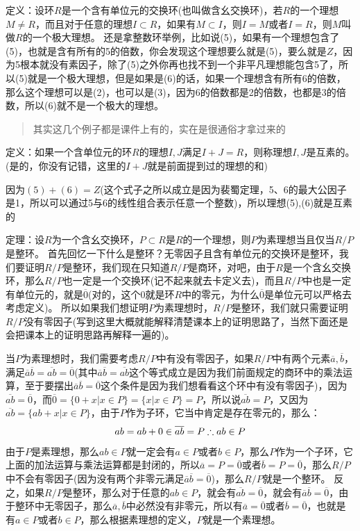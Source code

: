\documentclass[12pt, a4paper, oneside]{ctexart}
\newenvironment{myquote}{\begin{quote}\small\color{gray}}{\end{quote}}
\begin{document}
定义：设环$R$是一个含有单位元的交换环(也叫做含幺交换环)，若$R$的一个理想$M\neq R$，而且对于任意的理想$I\subset R$，如果有$M\subset I$，则$I=M$或者$I=R$，则$M$叫做$R$的一个极大理想。
还是拿整数环举例，比如说(5)，如果有一个理想包含了(5)，也就是含有所有的5的倍数，你会发现这个理想要么就是(5)，要么就是$Z$，因为5根本就没有素因子，除了(5)之外你再也找不到一个非平凡理想能包含5了，所以(5)就是一个极大理想，但是如果是(6)的话，如果一个理想含有所有6的倍数，那么这个理想可以是(2)，也可以是(3)，因为6的倍数都是2的倍数，也都是3的倍数，所以(6)就不是一个极大的理想。

\begin{myquote}
其实这几个例子都是课件上有的，实在是很通俗才拿过来的
\end{myquote}

定义：如果一个含单位元的环$R$的理想$I,J$满足$I+J=R$，则称理想$I,J$是互素的。(是的，你没有记错，这里的$I+J$就是前面提到过的理想的和)

因为$(5)+(6)=Z$(这个式子之所以成立是因为裴蜀定理，5、6的最大公因子是1，所以可以通过5与6的线性组合表示任意一个整数)，所以理想(5),(6)就是互素的

定理：设$R$为一个含幺交换环，$P\subset R$是$R$的一个理想，则$P$为素理想当且仅当$R/P$是整环。
首先回忆一下什么是整环？无零因子且含有单位元的交换环是整环，我们要证明$R/P$是整环，我们现在只知道$R/P$是商环，对吧，由于$R$是一个含幺交换环，那么$R/P$也一定是一个交换环(记不起来就去卡定义去)，而且$R/P$中也是一定有单位元的，就是$\overline{0}$(对的，这个0就是环$R$中的零元，为什么$\overline{0}$是单位元可以严格去考虑定义)。
所以如果我们想证明$P$为素理想时，$R/P$是整环，我们就只需要证明$R/P$没有零因子(写到这里大概就能解释清楚课本上的证明思路了，当然下面还是会把课本上的证明思路再解释一遍的)。

当$P$为素理想时，我们需要考虑$R/P$中有没有零因子，如果$R/P$中有两个元素$\overline{a},\overline{b}$，满足$\overline{a}\overline{b}=\overline{ab}=\overline{0}$(其中$\overline{a}\overline{b}=\overline{ab}$这个等式成立是因为我们前面规定的商环中的乘法运算，至于要摆出$\overline{a}\overline{b}=\overline{0}$这个条件是因为我们想看看这个环中有没有零因子)，因为$\overline{ab}=\overline{0}$，而$\overline{0}=\{0+x|x\in P\}=\{x|x\in P\}=P$，所以说$\overline{ab}=P$，又因为$\overline{ab}=\{ab+x|x\in P\}$，由于$P$作为子环，它当中肯定是存在零元的，那么：
\[
ab=ab+0\in\overline{ab}=P\\
\therefore ab\in P
\]
由于$P$是素理想，那么$ab\in P$就一定会有$a\in P$或者$b\in P$，那么$P$作为一个子环，它上面的加法运算与乘法运算都是封闭的，所以$\overline{a}=P=\overline{0}$或者$\overline{b}=P=\overline{0}$，那么$R/P$中不会有零因子(因为没有两个非零元满足$\overline{a}\overline{b}=\overline{0}$)，那么$R/P$就是一个整环。
反之，如果$R/P$是整环，那么对于任意的$ab\in P$，就会有$\overline{ab}=\overline{0}$，就会有$\overline{a}\overline{b}=\overline{0}$，由于整环中无零因子，那么$\overline{a},\overline{b}$中必然没有非零元，所以有$\overline{a}=\overline{0}$或者$\overline{b}=\overline{0}$，也就是有$a\in P$或者$b\in P$，那么根据素理想的定义，$P$就是一个素理想。
\end{document}
